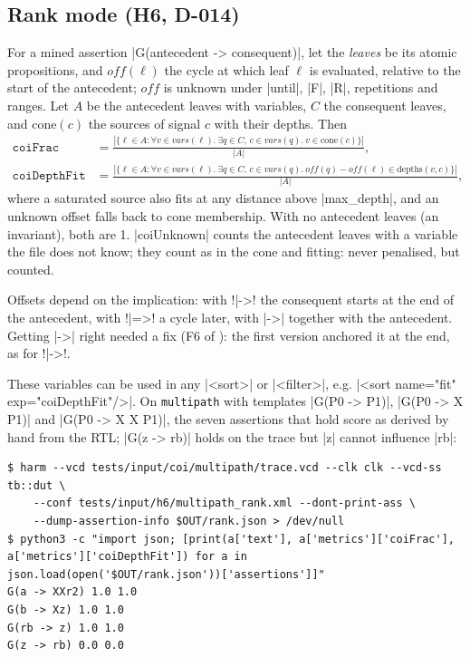 \subsection{Rank mode (H6, D-014)}
For a mined assertion \code|G(antecedent -> consequent)|, let the \emph{leaves} be its atomic propositions, and $\mathit{off}(\ell)$ the cycle at which leaf $\ell$ is evaluated, relative to the start of the antecedent; $\mathit{off}$ is unknown under \code|until|, \code|F|, \code|R|, repetitions and ranges. Let $A$ be the antecedent leaves with variables, $C$ the consequent leaves, and $\mathrm{cone}(c)$ the sources of signal $c$ with their depths. Then
\begin{align*}
\mathtt{coiFrac} &= \frac{|\{\ell \in A : \forall v \in \mathit{vars}(\ell).\ \exists q\in C,\, c \in \mathit{vars}(q).\ v \in \mathrm{cone}(c)\}|}{|A|},\\
\mathtt{coiDepthFit} &= \frac{|\{\ell \in A : \forall v \in \mathit{vars}(\ell).\ \exists q\in C,\, c \in \mathit{vars}(q).\ \mathit{off}(q)-\mathit{off}(\ell) \in \mathrm{depths}(v, c)\}|}{|A|},
\end{align*}
where a saturated source also fits at any distance above \code|max_depth|, and an unknown offset falls back to cone membership. With no antecedent leaves (an invariant), both are 1. \code|coiUnknown| counts the antecedent leaves with a variable the file does not know; they count as in the cone and fitting: never penalised, but counted.

Offsets depend on the implication: with \code!|->! the consequent starts at the end of the antecedent, with \code!|=>! a cycle later, with \code|->| together with the antecedent. Getting \code|->| right needed a fix (F6 of ): the first version anchored it at the end, as for \code!|->!.

These variables can be used in any \code|<sort>| or \code|<filter>|, e.g. \code|<sort name="fit" exp="coiDepthFit"/>|. On \texttt{multipath} with templates \code|G(P0 -> P1)|, \code|G(P0 -> X P1)| and \code|G(P0 -> X X P1)|, the seven assertions that hold score as derived by hand from the RTL; \code|G(z -> rb)| holds on the trace but \code|z| cannot influence \code|rb|:

\begin{lstlisting}
$ harm --vcd tests/input/coi/multipath/trace.vcd --clk clk --vcd-ss tb::dut \
    --conf tests/input/h6/multipath_rank.xml --dont-print-ass \
    --dump-assertion-info $OUT/rank.json > /dev/null
$ python3 -c "import json; [print(a['text'], a['metrics']['coiFrac'], a['metrics']['coiDepthFit']) for a in json.load(open('$OUT/rank.json'))['assertions']]"
G(a -> XXr2) 1.0 1.0
G(b -> Xz) 1.0 1.0
G(rb -> z) 1.0 1.0
G(z -> rb) 0.0 0.0
\end{lstlisting}

